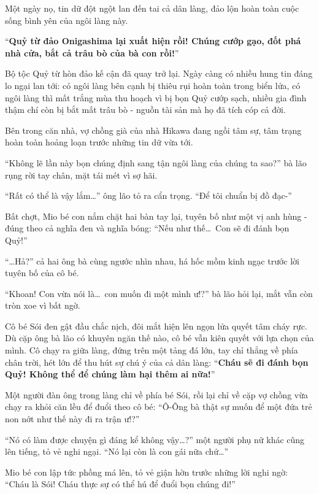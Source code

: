 \documentclass[../main.tex]{subfiles}
\begin{document}
Một ngày nọ, tin dữ đột ngột lan đến tai cả dân làng, đảo lộn hoàn toàn cuộc sống bình yên của ngôi làng này.

``\textbf{Quỷ từ đảo Onigashima lại xuất hiện rồi! Chúng cướp gạo, đốt phá nhà cửa, bắt cả trâu bò của bà con rồi!}''

Bộ tộc Quỷ từ hòn đảo kế cận đã quay trở lại. Ngày càng có nhiều hung tin đáng lo ngại lan tới: có ngôi làng bên cạnh bị thiêu rụi hoàn toàn trong biển lửa, có ngôi làng thì mất trắng mùa thu hoạch vì bị bọn Quỷ cướp sạch, nhiều gia đình thậm chí còn bị bắt mất trâu bò - nguồn tài sản mà họ đã tích cóp cả đời.

Bên trong căn nhà, vợ chồng già của nhà Hikawa đang ngồi tâm sự, tâm trạng hoàn toàn hoảng loạn trước những tin dữ vừa tới.

``Không lẽ lần này bọn chúng định sang tận ngôi làng của chúng ta sao?'' bà lão rụng rời tay chân, mặt tái mét vì sợ hãi.

``Rất có thể là vậy lắm\dots'' ông lão tỏ ra cẩn trọng. ``Để tôi chuẩn bị đồ đạc-''

Bất chợt, Mio bé con nắm chặt hai bàn tay lại, tuyên bố như một vị anh hùng - đúng theo cả nghĩa đen và nghĩa bóng: ``Nếu như thế\dots\ Con sẽ đi đánh bọn Quỷ!''

``\dots Hả?'' cả hai ông bà cùng ngước nhìn nhau, há hốc mồm kinh ngạc trước lời tuyên bố của cô bé.

``Khoan! Con vừa nói là\dots\ con muốn đi một mình ư!?'' bà lão hỏi lại, mắt vẫn còn tròn xoe vì bất ngờ.

Cô bé Sói đen gật đầu chắc nịch, đôi mắt hiện lên ngọn lửa quyết tâm cháy rực. Dù cặp ông bà lão có khuyên ngăn thế nào, cô bé vẫn kiên quyết với lựa chọn của mình. Cô chạy ra giữa làng, đứng trên một tảng đá lớn, tay chỉ thẳng về phía chân trời, hét lớn để thu hút sự chú ý của cả dân làng: ``\textbf{Cháu sẽ đi đánh bọn Quỷ! Không thể để chúng làm hại thêm ai nữa!}''

Một người đàn ông trong làng chỉ về phía bé Sói, rồi lại chỉ về cặp vợ chồng vừa chạy ra khỏi căn lều để đuổi theo cô bé: ``Ô-Ông bà thật sự muốn để một đứa trẻ non nớt như thế này đi ra trận ư!?''

``Nó có làm được chuyện gì đáng kể không vậy\dots?'' một người phụ nữ khác cũng lên tiếng, tỏ vẻ nghi ngại. ``Nó lại còn là con gái nữa chứ\dots''

Mio bé con lập tức phồng má lên, tỏ vẻ giận hờn trước những lời nghi ngờ: ``Cháu là Sói! Cháu thực sự có thể hú để đuổi bọn chúng đi!''
\end{document}
